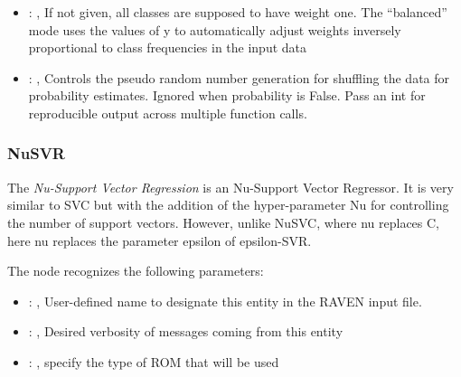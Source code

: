 \begin{itemize}
    \item {}: \xmlDesc{[balanced]},
      If not given, all classes are supposed to have weight one.
      The “balanced” mode uses the values of y to automatically adjust weights
      inversely proportional to class frequencies in the input data

    \item {}: ,
      Controls the pseudo random number generation for shuffling
      the data for probability estimates. Ignored when probability is False.
      Pass an int for reproducible output across multiple function calls.
  \end{itemize}


\subsubsection{NuSVR}
  The  \textit{Nu-Support Vector Regression} is an Nu-Support Vector Regressor.
  It is very similar to SVC but with the addition of the hyper-parameter Nu for controlling the
  number of support vectors. However, unlike NuSVC, where nu replaces C,
  here nu replaces the parameter epsilon of epsilon-SVR.

  The  node recognizes the following parameters:
    \begin{itemize}
      \item {}: ,
        User-defined name to designate this entity in the RAVEN input file.
      \item {}: ,
        Desired verbosity of messages coming from this entity
      \item {}: ,
        specify the type of ROM that will be used
  \end{itemize}

